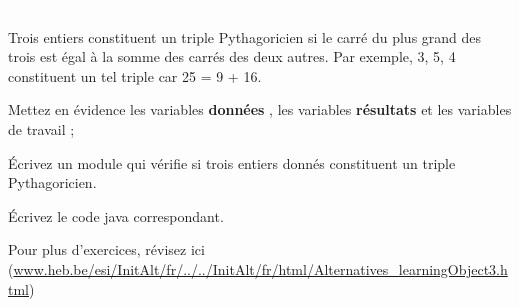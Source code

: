 \documentclass[11pt,a4paper]{article}
\begin{document}
					\textcolor{white}{.} \par
				
          Trois entiers constituent un triple Pythagoricien si le carr\'e du plus grand des trois est \'egal \`a la somme des carr\'es des deux autres. 
          Par exemple, 3, 5, 4 constituent un tel triple car 25 = 9 + 16.
        
            \par
        
          Mettez en \'evidence les variables \textbf{\guillemotleft  donn\'ees \guillemotright }, 
          les variables \textbf{\guillemotleft  r\'esultats \guillemotright } et les variables de travail ;
        
            \par
        
          \'Ecrivez un module qui v\'erifie si trois entiers donn\'es constituent un triple Pythagoricien.
        
            \par
        \'Ecrivez le code java correspondant.
            \par
        Pour plus d'exercices, 
        r\'evisez ici (\url{www.heb.be/esi/InitAlt/fr/../../InitAlt/fr/html/Alternatives\_learningObject3.html})
            \par
        
				
\end{document}
